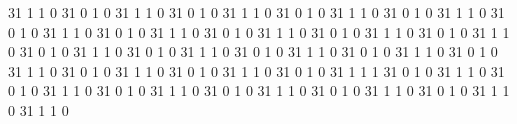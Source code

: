 31
1
1
0
31
0
1
0
31
1
1
0
31
0
1
0
31
1
1
0
31
0
1
0
31
1
1
0
31
0
1
0
31
1
1
0
31
0
1
0
31
1
1
0
31
0
1
0
31
1
1
0
31
0
1
0
31
1
1
0
31
0
1
0
31
1
1
0
31
0
1
0
31
1
1
0
31
0
1
0
31
1
1
0
31
0
1
0
31
1
1
0
31
0
1
0
31
1
1
0
31
0
1
0
31
1
1
0
31
0
1
0
31
1
1
0
31
0
1
0
31
1
1
0
31
0
1
0
31
1
1
0
31
0
1
0
31
1
1
1
31
0
1
0
31
1
1
0
31
0
1
0
31
1
1
0
31
0
1
0
31
1
1
0
31
0
1
0
31
1
1
0
31
0
1
0
31
1
1
0
31
0
1
0
31
1
1
0
31
1
1
0
